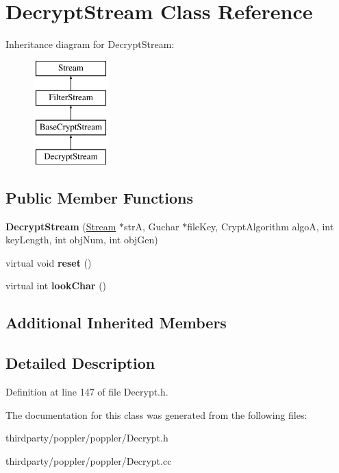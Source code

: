 \hypertarget{class_decrypt_stream}{}\section{Decrypt\+Stream Class Reference}
\label{class_decrypt_stream}
Inheritance diagram for Decrypt\+Stream\+:\begin{figure}[H]
\begin{center}
\leavevmode
\includegraphics[height=4.000000cm]{class_decrypt_stream}
\end{center}
\end{figure}
\subsection*{Public Member Functions}
\begin{DoxyCompactItemize}
\item 
\mbox{\label{class_decrypt_stream_a2eb51be9b0d03ec1f7ee36aef70c65ab}} 
{\bfseries Decrypt\+Stream} (\hyperlink{class_stream}{Stream} $\ast$strA, Guchar $\ast$file\+Key, Crypt\+Algorithm algoA, int key\+Length, int obj\+Num, int obj\+Gen)
\item 
\mbox{\label{class_decrypt_stream_aedc1dec9ed3d9237e7fd23f3f3cdb5e3}} 
virtual void {\bfseries reset} ()
\item 
\mbox{\label{class_decrypt_stream_aa660188d7bee7dbc02a81e84eea6bfab}} 
virtual int {\bfseries look\+Char} ()
\end{DoxyCompactItemize}
\subsection*{Additional Inherited Members}


\subsection{Detailed Description}


Definition at line 147 of file Decrypt.\+h.



The documentation for this class was generated from the following files\+:\begin{DoxyCompactItemize}
\item 
thirdparty/poppler/poppler/Decrypt.\+h\item 
thirdparty/poppler/poppler/Decrypt.\+cc\end{DoxyCompactItemize}
